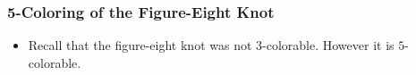 \documentclass{beamer}
\begin{document}
\begin{frame}
  \frametitle{5-Coloring of the Figure-Eight Knot}
  \begin{itemize}
  \item Recall that the figure-eight knot was not $3$-colorable.
    However it is $5$-colorable.
  \end{itemize}
  \begin{center}
  \end{center}
\end{frame}
\end{document}

